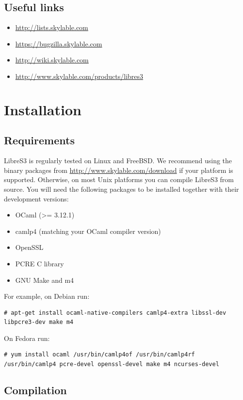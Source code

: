 \section*{Useful links}
\begin{itemize}
    \item \url{http://lists.skylable.com}
    \item \url{https://bugzilla.skylable.com}
    \item \url{http://wiki.skylable.com}
    \item \url{http://www.skylable.com/products/libres3}
\end{itemize}

\chapter{Installation}

\section*{Requirements}

LibreS3 is regularly tested on Linux and FreeBSD. We recommend using the
binary packages from \url{http://www.skylable.com/download} if your platform
is supported. Otherwise, on most Unix platforms you can compile LibreS3
from source. You will need the following packages to be installed together with their
development versions:
\begin{itemize}
    \item OCaml (>= 3.12.1)
    \item camlp4 (matching your OCaml compiler version)
    \item OpenSSL
    \item PCRE C library
    \item GNU Make and m4
\end{itemize}
For example, on Debian run:

\begin{lstlisting}
# apt-get install ocaml-native-compilers camlp4-extra libssl-dev libpcre3-dev make m4
\end{lstlisting}

On Fedora run:

\begin{lstlisting}
# yum install ocaml /usr/bin/camlp4of /usr/bin/camlp4rf /usr/bin/camlp4 pcre-devel openssl-devel make m4 ncurses-devel
\end{lstlisting}


\newpage
\section*{Compilation}

